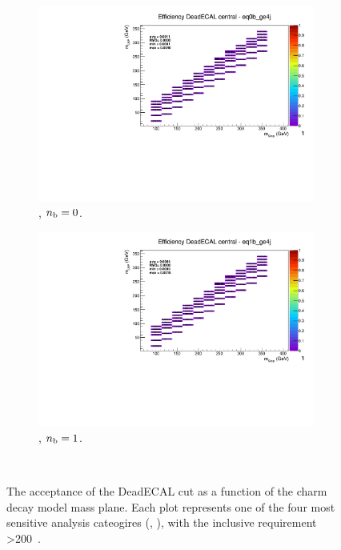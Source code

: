 \begin{figure}[h!]
  \begin{subfigure}[b]{0.4\textwidth}
    \includegraphics[width=\textwidth, page=6]{Figs/sms/t2cc/v37_3/systs/T2cc_DeadECAL_eq0b_ge4j.pdf}
    \caption{\njhigh, $n_{\text{b}} = 0$.}
  \end{subfigure}
  \begin{subfigure}[b]{0.4\textwidth}
    \includegraphics[width=\textwidth, page=6]{Figs/sms/t2cc/v37_3/systs/T2cc_DeadECAL_eq1b_ge4j.pdf}
    \caption{\njhigh, $n_{\text{b}} = 1$.}
  \end{subfigure}\\
  \caption{The acceptance of the DeadECAL cut as a function of the charm decay
  model
  mass plane. Each plot represents one of the four most sensitive 
  analysis cateogires (\nb, \nj), with the inclusive requirement \HT>200~\gev.}
  \label{fig:sms-deadecal-t2cc}
\end{figure}

